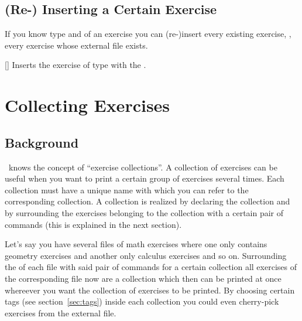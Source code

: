 \documentclass{xsim-manual}
\begin{document}
\subsection{(Re-) Inserting a Certain Exercise}
If you know type and  of an exercise you can (re-)insert every
existing exercise, \ie, every exercise whose external file exists.
\begin{commands}
  []
    Inserts the exercise of type  with the 
    .
\end{commands}
\begin{example}
\end{example}

\section{Collecting Exercises}\label{sec:collecting-exercises}

\subsection{Background}
\xsim\ knows the concept of \enquote{exercise collections}.  A collection of
exercises can be useful when you want to print a certain group of exercises
several times.  Each collection must have a unique name with which you can
refer to the corresponding collection.  A collection is realized by declaring
the collection and by surrounding the exercises belonging to the collection
with a certain pair of commands (this is explained in the next section).

Let's say you have several files of math exercises where one only contains
geometry exercises and another only calculus exercises and so on.  Surrounding
the  of each file with said pair of commands for a certain
collection all exercises of the corresponding file now are a collection which
then can be printed at once whereever you want the collection of exercises to
be printed.  By choosing certain tags (see section~\vref{sec:tags}) inside
each collection you could even cherry-pick exercises from the external file.
\end{document}
